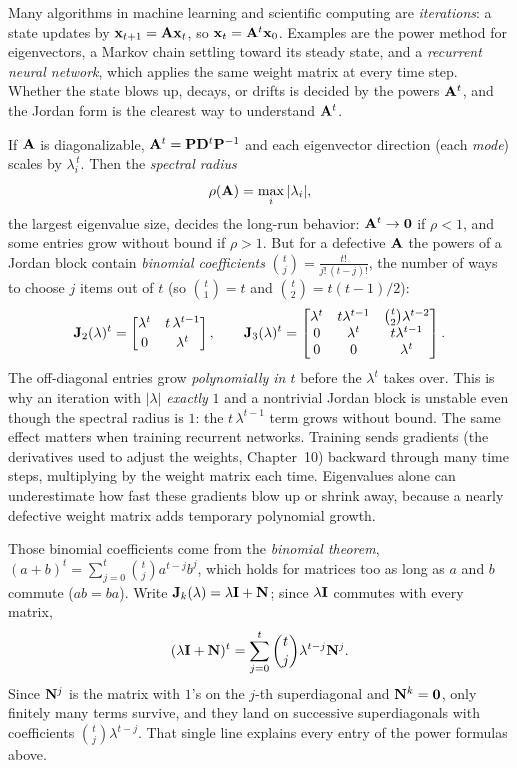 \begin{applicationbox}
Many algorithms in machine learning and scientific computing are \emph{iterations}: a
state updates by $\mathbf{x}_{t+1}=\mathbf{A}\mathbf{x}_t$, so $\mathbf{x}_t=\mathbf{A}^t\mathbf{x}_0$.
Examples are the power method for eigenvectors, a Markov chain settling toward its
steady state, and a \emph{recurrent neural network}, which applies the same weight matrix
at every time step. Whether the state blows up, decays, or drifts is decided by the
powers $\mathbf{A}^t$, and the Jordan form is the clearest way to understand $\mathbf{A}^t$.

If $\mathbf{A}$ is diagonalizable, $\mathbf{A}^t=\mathbf{P}\mathbf{D}^t\mathbf{P}^{-1}$ and each
eigenvector direction (each \emph{mode}) scales by $\lambda_i^{\,t}$. Then the
\emph{spectral radius}
\[
\rho(\mathbf{A}) = \max_i|\lambda_i|,
\]
the largest eigenvalue size, decides the long-run behavior: $\mathbf{A}^t\to\mathbf{0}$ if
$\rho<1$, and some entries grow without bound if $\rho>1$.
But for a defective $\mathbf{A}$ the powers of a Jordan block contain \emph{binomial
coefficients} $\binom{t}{j}=\frac{t!}{j!\,(t-j)!}$, the number of ways to choose $j$ items
out of $t$ (so $\binom{t}{1}=t$ and $\binom{t}{2}=t(t-1)/2$):
\[
\mathbf{J}_2(\lambda)^t=\begin{bmatrix}\lambda^t & t\,\lambda^{t-1}\\[2pt]0&\lambda^t\end{bmatrix},
\qquad
\mathbf{J}_3(\lambda)^t=\begin{bmatrix}\lambda^t & t\lambda^{t-1} & \binom{t}{2}\lambda^{t-2}\\
0 & \lambda^t & t\lambda^{t-1}\\ 0&0&\lambda^t\end{bmatrix}.
\]
The off-diagonal entries grow \emph{polynomially in $t$} before the $\lambda^t$ takes
over. This is why an iteration with $|\lambda|$ \emph{exactly} $1$ and a nontrivial Jordan
block is unstable even though the spectral radius is $1$: the $t\,\lambda^{t-1}$ term
grows without bound. The same effect matters when training recurrent networks. Training
sends gradients (the derivatives used to adjust the weights, Chapter~10) backward through
many time steps, multiplying by the weight matrix each time. Eigenvalues alone can
underestimate how fast these gradients blow up or shrink away, because a nearly defective
weight matrix adds temporary polynomial growth.
\end{applicationbox}

Those binomial coefficients come from the \emph{binomial theorem},
$(a+b)^t=\sum_{j=0}^{t}\binom{t}{j}a^{t-j}b^{j}$, which holds for matrices too as long as
$a$ and $b$ commute ($ab=ba$). Write $\mathbf{J}_k(\lambda)=\lambda\mathbf{I}+\mathbf{N}$; since
$\lambda\mathbf{I}$ commutes with every matrix,
\[
(\lambda\mathbf{I}+\mathbf{N})^t=\sum_{j=0}^{t}\binom{t}{j}\lambda^{t-j}\mathbf{N}^{j}.
\]
Since $\mathbf{N}^j$ is the matrix with $1$'s on the $j$-th superdiagonal and $\mathbf{N}^k=\mathbf{0}$,
only finitely many terms survive, and they land on successive superdiagonals with
coefficients $\binom{t}{j}\lambda^{t-j}$. That single line explains every entry of the
power formulas above.


